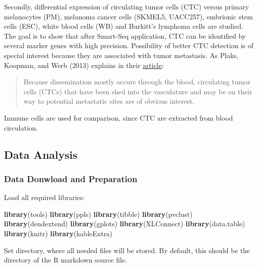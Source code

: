 \documentclass[]{article}
\newenvironment{Shaded}{\begin{snugshade}}{\end{snugshade}}
\newcommand{\KeywordTok}[1]{\textcolor[rgb]{0.13,0.29,0.53}{\textbf{#1}}}
\newcommand{\DataTypeTok}[1]{\textcolor[rgb]{0.13,0.29,0.53}{#1}}
\newcommand{\StringTok}[1]{\textcolor[rgb]{0.31,0.60,0.02}{#1}}
\newcommand{\CommentTok}[1]{\textcolor[rgb]{0.56,0.35,0.01}{\textit{#1}}}
\newcommand{\OperatorTok}[1]{\textcolor[rgb]{0.81,0.36,0.00}{\textbf{#1}}}
\newcommand{\NormalTok}[1]{#1}
\begin{document}
Secondly, differential expression of circulating tumor cells (CTC)
versus primary melanocytes (PM), melanoma cancer cells (SKMEL5,
UACC257), embrionic stem cells (ESC), white blood cells (WB) and
Burkitt's lymphoma cells are studied. The goal is to show that after
Smart-Seq application, CTC can be identified by several marker genes
with high precision. Possibility of better CTC detection is of special
interest because they are associated with tumor metastasis. As Plaks,
Koopman, and Werb (2013) explains in their
\href{http://science.sciencemag.org/content/341/6151/1186.long}{article}:

\begin{quote}
Because dissemination mostly occurs through the blood, circulating tumor
cells (CTCs) that have been shed into the vasculature and may be on
their way to potential metastatic sites are of obvious interest.
\end{quote}

Immune cells are used for comparison, since CTC are extracted from blood
circulation.

\subsection{Data Analysis}\label{data-analysis}

\subsubsection{Data Donwload and
Preparation}\label{data-donwload-and-preparation}

Load all required libraries:

\begin{Shaded}
\begin{Highlighting}[]
\KeywordTok{library}\NormalTok{(tools)}
\KeywordTok{library}\NormalTok{(ppls)}
\KeywordTok{library}\NormalTok{(tibble)}
\KeywordTok{library}\NormalTok{(pvclust)}
\KeywordTok{library}\NormalTok{(dendextend)}
\KeywordTok{library}\NormalTok{(gplots)}
\KeywordTok{library}\NormalTok{(XLConnect)}
\KeywordTok{library}\NormalTok{(data.table)}
\KeywordTok{library}\NormalTok{(knitr)}
\KeywordTok{library}\NormalTok{(kableExtra)}
\end{Highlighting}
\end{Shaded}

Set directory, where all needed files will be stored. By default, this
should be the directory of the R markdown source file.

\begin{Shaded}
\end{Shaded}
\end{document}
